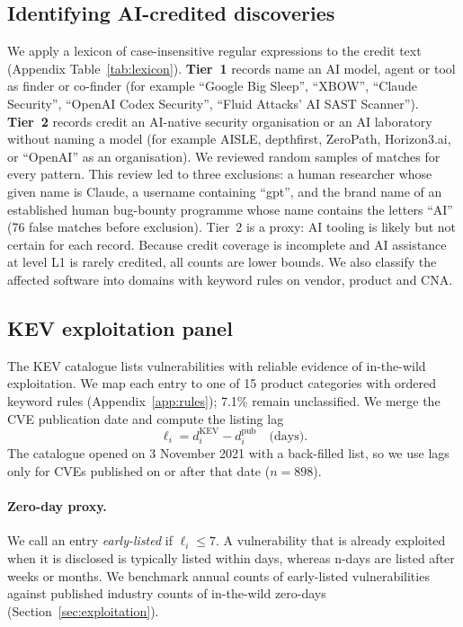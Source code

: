 \documentclass[11pt,a4paper]{article}
\begin{document}
\subsection{Identifying AI-credited discoveries}
We apply a lexicon of case-insensitive regular expressions to the credit text (Appendix Table~\ref{tab:lexicon}). \textbf{Tier~1} records name an AI model, agent or tool as finder or co-finder (for example ``Google Big Sleep'', ``XBOW'', ``Claude Security'', ``OpenAI Codex Security'', ``Fluid Attacks' AI SAST Scanner''). \textbf{Tier~2} records credit an AI-native security organisation or an AI laboratory without naming a model (for example AISLE, depthfirst, ZeroPath, Horizon3.ai, or ``OpenAI'' as an organisation). We reviewed random samples of matches for every pattern. This review led to three exclusions: a human researcher whose given name is Claude, a username containing ``gpt'', and the brand name of an established human bug-bounty programme whose name contains the letters ``AI'' (76 false matches before exclusion). Tier~2 is a proxy: AI tooling is likely but not certain for each record. Because credit coverage is incomplete and AI assistance at level L1 is rarely credited, all counts are lower bounds. We also classify the affected software into domains with keyword rules on vendor, product and CNA.

\subsection{KEV exploitation panel}
The KEV catalogue \citep{cisa2026kev} lists vulnerabilities with reliable evidence of in-the-wild exploitation. We map each entry to one of 15 product categories with ordered keyword rules (Appendix~\ref{app:rules}); 7.1\% remain unclassified. We merge the CVE publication date and compute the listing lag
\begin{equation}
\ell_i = d^{\text{KEV}}_i - d^{\text{pub}}_i \quad\text{(days)}.
\end{equation}
The catalogue opened on 3 November 2021 with a back-filled list, so we use lags only for CVEs published on or after that date ($n=898$).

\paragraph{Zero-day proxy.} We call an entry \emph{early-listed} if $\ell_i \le 7$. A vulnerability that is already exploited when it is disclosed is typically listed within days, whereas n-days are listed after weeks or months. We benchmark annual counts of early-listed vulnerabilities against published industry counts of in-the-wild zero-days (Section~\ref{sec:exploitation}).
\end{document}
